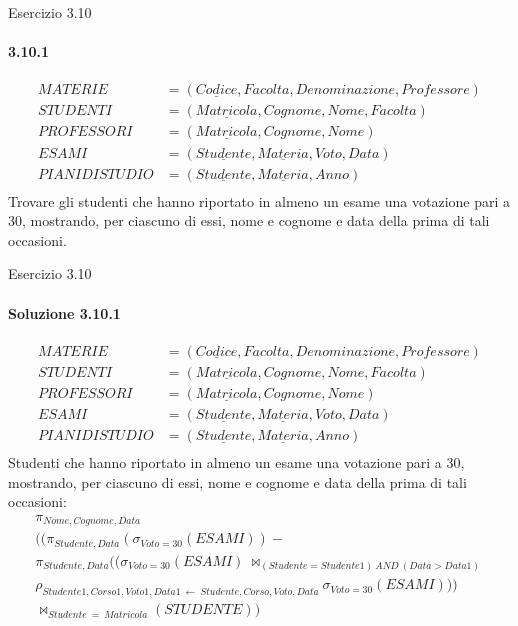\def\schemaEx3.10{\small \begin{align*}
    MATERIE &= (\underline{Codice}, Facolta, Denominazione, Professore)\\
    STUDENTI &= (\underline{Matricola}, Cognome, Nome, Facolta)\\
    PROFESSORI &= (\underline{Matricola}, Cognome, Nome)\\
    ESAMI &= (\underline{Studente}, \underline{Materia}, Voto, Data)\\
    PIANIDISTUDIO &= (\underline{Studente}, \underline{Materia}, Anno)\\
    \end{align*}}
\begin{frame}{Esercizio 3.10}
    \framesubtitle{3.10.1}
    \schemaEx3.10
    Trovare gli studenti che hanno riportato in almeno un esame una votazione pari a 30, mostrando, per ciascuno di essi, nome e cognome e data della prima di tali occasioni.
\end{frame}
%
\begin{frame}{Esercizio 3.10}
    \framesubtitle{Soluzione 3.10.1}
    \vspace*{-1.2cm}
    \schemaEx3.10
    {\small Studenti che hanno riportato in almeno un esame una votazione pari a 30, mostrando, per ciascuno di essi, nome e cognome e data della prima di tali occasioni:}
    \small
    \begin{gather*}
        \pi_{Nome,Cognome,Data}\\
        ((\pi_{Studente,Data}(\sigma_{Voto=30} (ESAMI))-\\
        {\pi_{Studente,Data} ((\sigma_{Voto=30}(ESAMI)~\bowtie_{(Studente=Studente1)~AND~(Data>Data1)}}\\
        {\rho_{Studente1,Corso1,Voto1,Data1~\leftarrow~Studente,Corso,Voto,Data}~\sigma_{Voto=30}(ESAMI)))}\\
        {\bowtie_{Studente~=~Matricola}(STUDENTE))}
    \end{gather*}
\end{frame}
%
